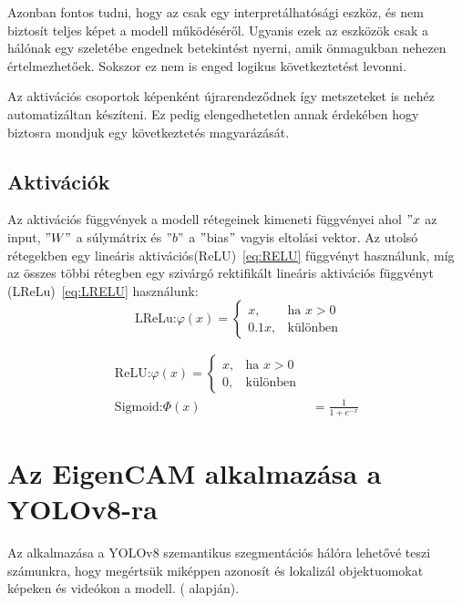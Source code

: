 \documentclass[12pt,oneside,a4paper]{article}
\newcommand{\newsection}[1]{\clearpage\section{#1}}\label{makro}
\theoremstyle{remark}
\begin{document}
	Azonban fontos tudni, hogy az  csak egy interpretálhatósági eszköz, és nem biztosít teljes képet
	a modell működéséről.
	Ugyanis ezek az eszközök csak a hálónak egy szeletébe engednek betekintést nyerni, amik önmagukban nehezen értelmezhetőek.
	Sokszor ez nem is enged logikus következtetést levonni.
	
	Az aktivációs csoportok képenként újrarendeződnek így metszeteket is nehéz automatizáltan készíteni.
	Ez pedig elengedhetetlen annak érdekében hogy biztosra mondjuk egy következtetés magyarázását.
	
	\subsection{Aktivációk}\label{subsec:activations}
	Az aktivációs függvények a modell rétegeinek kimeneti függvényei ahol \("x\) az input, \("W"\) a súlymátrix és \("b"\) a
	\("\)bias\("\) vagyis eltolási vektor.
	Az utolsó rétegekben egy lineáris aktivációs(\ac{ReLU})~\eqref{eq:RELU}\label{alignhivatkozas} függvényt használunk,
	míg az összes többi rétegben egy
	szivárgó rektifikált lineáris aktivációs függvényt (\ac{LReLu})~\eqref{eq:LRELU}\label{eqhivatkozas} használunk:
	\begin{equation}
		\text{ LReLu:}
		\varphi(x) = \begin{cases}
			x, & \text{ha } x > 0 \\
			0.1x, & \text{különben}
		\end{cases}\label{eq:LRELU}
	\end{equation}\label{eq:activation_functions}
	
	
	\begin{align}
		\text{ReLU:}
		\varphi(x)=\begin{cases}
			x, & \text{ha } x > 0 \\
			0, & \text{különben} \end{cases}\label{eq:RELU} \\
		\text{Sigmoid:}
		\varPhi(x) &= \frac{1}{1 + e^{-x}} \label{eq:Sigmoid}
	\end{align}
	
	\newsection{Az EigenCAM alkalmazása a YOLOv8-ra}\label{sec:az-eigencam-alkalmazasa-a-yolov8-ra}
	Az  alkalmazása a YOLOv8 szemantikus szegmentációs hálóra lehetővé teszi számunkra,
	hogy megértsük miképpen azonosít és lokalizál objektuomokat képeken és videókon a modell.
	(\cite{YoloV8-CAM} alapján).
	
\end{document}
